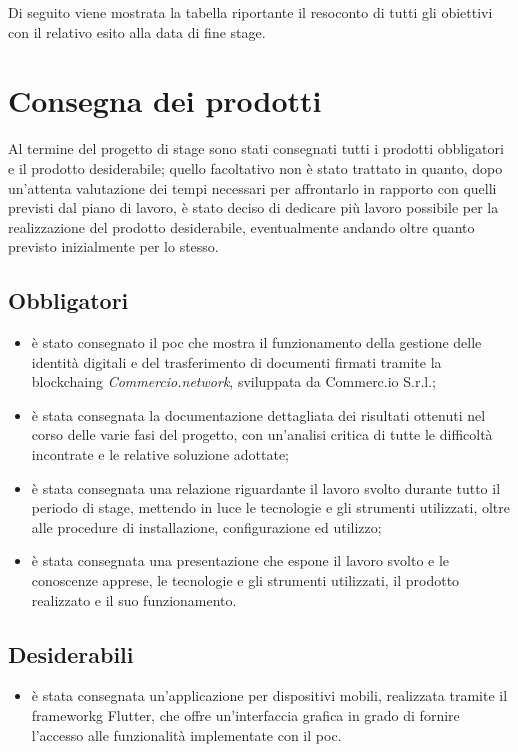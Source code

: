 Di seguito viene mostrata la tabella riportante il resoconto di tutti gli obiettivi con il relativo esito alla data di fine stage.

\section{Consegna dei prodotti}

Al termine del progetto di stage sono stati consegnati tutti i prodotti obbligatori e il prodotto desiderabile; quello facoltativo non è stato trattato in quanto, dopo un'attenta valutazione dei tempi necessari per affrontarlo in rapporto con quelli previsti dal piano di lavoro, è stato deciso di dedicare più lavoro possibile per la realizzazione del prodotto desiderabile, eventualmente andando oltre quanto previsto inizialmente per lo stesso.

\subsection{Obbligatori}
\begin{itemize}
	\item è stato consegnato il \gls{poc} che mostra il funzionamento della gestione delle identità digitali e del trasferimento di documenti firmati tramite la \gls{blockchaing} \textit{Commercio.network}, sviluppata da Commerc.io S.r.l.;
	\item è stata consegnata la documentazione dettagliata dei risultati ottenuti nel corso delle varie fasi del progetto, con un'analisi critica di tutte le difficoltà incontrate e le relative soluzione adottate;
	\item è stata consegnata una relazione riguardante il lavoro svolto durante tutto il periodo di stage, mettendo in luce le tecnologie e gli strumenti utilizzati, oltre alle procedure di installazione, configurazione ed utilizzo;
	\item è stata consegnata una presentazione che espone il lavoro svolto e le conoscenze apprese, le tecnologie e gli strumenti utilizzati, il prodotto realizzato e il suo funzionamento.
\end{itemize}

\subsection{Desiderabili}

\begin{itemize}
	\item è stata consegnata un'applicazione per dispositivi mobili, realizzata tramite il \gls{frameworkg} Flutter, che offre un'interfaccia grafica in grado di fornire l'accesso alle funzionalità implementate con il \gls{poc}.
\end{itemize}

